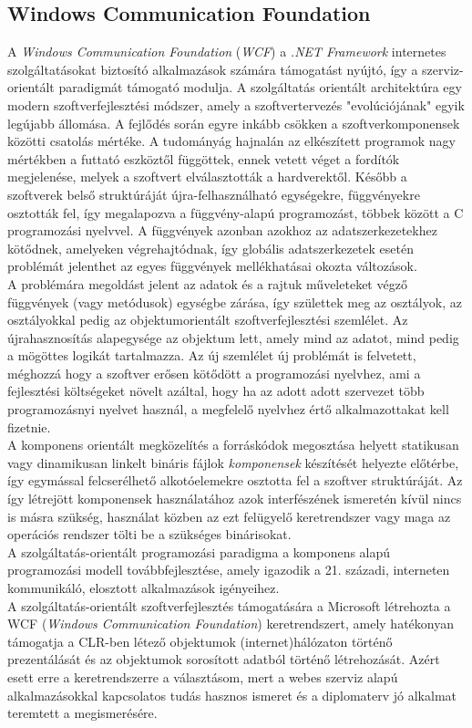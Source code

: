 \subsection{Windows Communication Foundation} \label{ssection:wcf_intro}
A \emph{Windows Communication Foundation} (\emph{WCF}) a \textit{.NET Framework} internetes szolgáltatásokat biztosító alkalmazások számára támogatást nyújtó, így a szerviz-orientált paradigmát támogató modulja. A szolgáltatás orientált architektúra egy modern szoftverfejlesztési módszer, amely a szoftvertervezés "evolúciójának" egyik legújabb állomása. A fejlődés során egyre inkább csökken a szoftverkomponensek közötti csatolás mértéke. A tudományág hajnalán az elkészített programok nagy mértékben a futtató eszköztől függöttek, ennek vetett véget a fordítók megjelenése, melyek a szoftvert elválasztották a hardverektől. Később a szoftverek belső struktúráját újra-felhasználható egységekre, függvényekre osztották fel, így megalapozva a függvény-alapú programozást, többek között a C programozási nyelvvel. A függvények azonban azokhoz az adatszerkezetekhez kötődnek, amelyeken végrehajtódnak, így globális adatszerkezetek esetén problémát jelenthet az egyes függvények mellékhatásai okozta változások.\\
A problémára megoldást jelent az adatok és a rajtuk műveleteket végző függvények (vagy metódusok) egységbe zárása, így születtek meg az osztályok, az osztályokkal pedig az objektumorientált szoftverfejlesztési szemlélet. Az újrahasznosítás alapegysége az objektum lett, amely mind az adatot, mind pedig a mögöttes logikát tartalmazza. Az új szemlélet új problémát is felvetett, méghozzá hogy a szoftver erősen kötődött a programozási nyelvhez, ami a fejlesztési költségeket növelt azáltal, hogy ha az adott adott szervezet több programozásnyi nyelvet használ, a megfelelő nyelvhez értő alkalmazottakat kell fizetnie.\\
A komponens orientált megközelítés a forráskódok megosztása helyett statikusan vagy dinamikusan linkelt bináris fájlok \emph{komponensek} készítését helyezte előtérbe, így egymással felcserélhető alkotóelemekre osztotta fel a szoftver struktúráját. Az így létrejött komponensek használatához azok interfészének ismeretén kívül nincs is másra szükség, használat közben az ezt felügyelő keretrendszer vagy maga az operációs rendszer tölti be a szükséges binárisokat. \\
A szolgáltatás-orientált programozási paradigma a komponens alapú programozási modell továbbfejlesztése, amely igazodik a 21. századi, interneten kommunikáló, elosztott alkalmazások igényeihez.\cite{wcf-programmin}\\
A szolgáltatás-orientált szoftverfejlesztés támogatására a Microsoft létrehozta a WCF (\emph{Windows Communication Foundation}) keretrendszert, amely hatékonyan támogatja a CLR-ben létező objektumok (internet)hálózaton történő prezentálását és az objektumok sorosított adatból történő létrehozását. Azért esett erre a keretrendszerre a választásom, mert a webes szerviz alapú alkalmazásokkal kapcsolatos tudás hasznos ismeret és a diplomaterv jó alkalmat teremtett a megismerésére.

